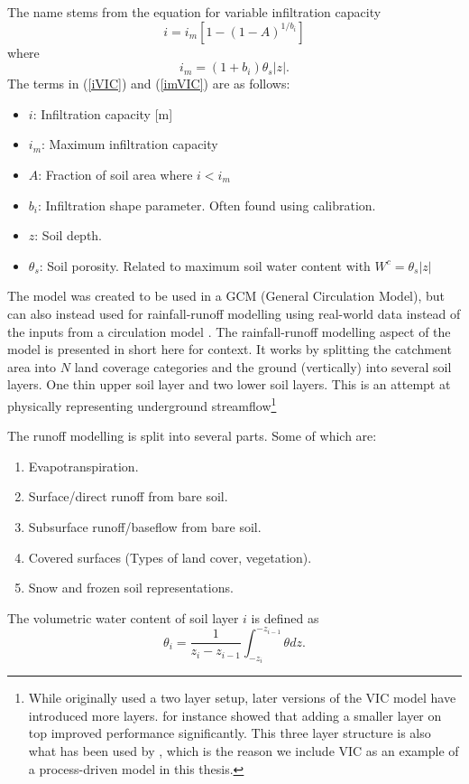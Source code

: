 The name stems from the equation for variable infiltration capacity
\begin{equation}
    i = i_m \left[ 1 - (1-A)^{1/b_i}  \right] \label{iVIC}
\end{equation}
where
\begin{equation}
    i_m = (1+b_i)\theta_s|z|.  \label{imVIC}
\end{equation} \citep{VIC2L}
The terms in (\ref{iVIC}) and (\ref{imVIC}) are as follows:
\begin{itemize}
    \item $i$: Infiltration capacity [m]
    \item $i_m$: Maximum infiltration capacity
    \item $A$: Fraction of soil area where $i < i_m$
    \item $b_i$: Infiltration shape parameter. Often found using calibration.
    \item $z$: Soil depth.
    \item $\theta_s$: Soil porosity. Related to maximum soil water content with $W^c = \theta_s |z|$
\end{itemize}

The model was created to be used in a GCM (General Circulation Model), but can also 
instead used for rainfall-runoff modelling using real-world data instead of the inputs 
from a circulation model \citep{VICbench}. The rainfall-runoff modelling aspect 
of the model is presented in short here for context. It works by splitting the catchment 
area into $N$ land coverage categories and the ground (vertically) into several soil layers. 
One thin  upper soil layer and two lower soil layers. This is an attempt at physically 
representing underground streamflow\footnote{While \citet{VIC} originally used a 
two layer setup, later versions of the VIC model have introduced more layers. 
\citet{VIC2L} for instance showed that adding a smaller layer on top improved performance 
significantly. This three layer structure is also what has been used by \citet{VICbench}, 
which is the reason we include VIC as an example of a process-driven model in this thesis.}

The runoff modelling is split into several parts. Some of which are:
\begin{enumerate}
    \item Evapotranspiration.
	\item Surface/direct runoff from bare soil.
	\item Subsurface runoff/baseflow from bare soil.
	\item Covered surfaces (Types of land cover, vegetation).
	\item Snow and frozen soil representations.
\end{enumerate}
The volumetric water content of soil layer $i$ is defined as 
\begin{equation}
    \theta_i = \frac{1}{z_i - z_{i-1}} \int_{-z_i}^{-z_{i-1}} \theta dz. \label{theta i}
\end{equation}


